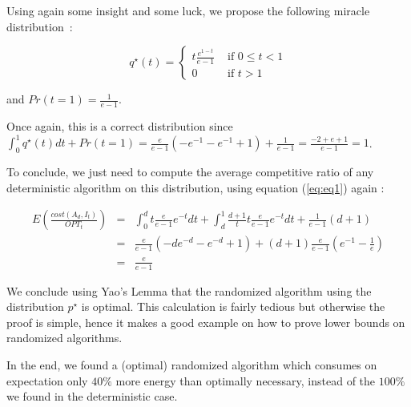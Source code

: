 Using again some insight and some luck, we propose the following miracle distribution~:

$$q^\star(t) = \left\{\begin{array}{ll} t \frac{e^{1-t}}{e-1} & \text{ if }  0\leq t <1 \\
0 & \text{ if } t >1\end{array}\right.$$

and $Pr(t=1) = \frac{1}{e-1}$.

Once again, this is a correct distribution since $\int_0^1 q^\star(t)dt + Pr(t=1)=\frac{e}{e-1}(-e^{-1} - e^{-1}+1)+\frac{1}{e-1}=\frac{-2+e+1}{e-1}=1$. 

To conclude, we just need to compute the average competitive ratio of any deterministic algorithm on this distribution, using equation (\ref{eq:eq1}) again :

\begin{eqnarray*}
E(\frac{cost(A_d,I_t)}{OPT_t}) &= &\int_0^d t \frac{e}{e-1}e^{-t}dt + \int_d^1 \frac{d+1}{t}t \frac{e}{e-1} e^{-t}dt + \frac{1}{e-1}(d+1)\\
&=& \frac{e}{e-1}(-de^{-d}-e^{-d}+1) + (d+1)\frac{e}{e-1}(e^{-1}-\frac{1}{e})\\
&=&\frac{e}{e-1}
\end{eqnarray*}

We conclude using Yao's Lemma that the randomized algorithm using the distribution $p^\star$ is optimal. This calculation is fairly tedious but otherwise the proof is simple, hence it makes a good example on how to prove lower bounds on randomized algorithms.

\bigskip

In the end, we found a (optimal) randomized algorithm which consumes on expectation only $40\%$ more energy than optimally necessary, instead of the $100\%$ we found in the deterministic case.





